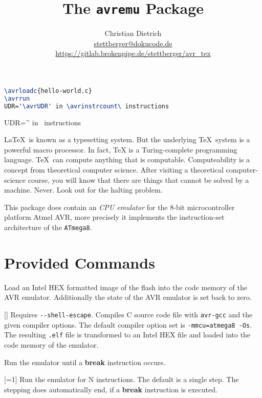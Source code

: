 \documentclass{article}
\title{The \texttt{avremu} Package}
\author{Christian Dietrich\\
\url{stettberger@dokucode.de}\\
\url{https://gitlab.brokenpipe.de/stettberger/avr_tex}}
\begin{document}
\maketitle

\begin{tcolorbox}
  
  \tcblower
  \begin{lstlisting}[language=TeX]
\avrloadc{hello-world.c}
\avrrun
UDR='\avrUDR' in \avrinstrcount\ instructions
\end{lstlisting}
\end{tcolorbox}
\begin{tcolorbox}
\avrrun
UDR='\avrUDR' in \avrinstrcount\ instructions
\end{tcolorbox}


\LaTeX\ is known as a typesetting system. But the underlying \TeX\ system is a powerful macro
processor. In fact, TeX is a Turing-complete programming language. \TeX\ can compute anything that
is computable. Computeability is a concept from theoretical computer science. After visiting a
theoretical computer-science course, you will know that there are things that cannot be solved by a
machine. Never. Look out for the halting problem. 

This package does contain an \emph{CPU emulator} for the 8-bit microcontroller platform Atmel AVR, more
precisely it implements the instruction-set architecture of the \texttt{ATmega8}.

\section{Provided Commands}

Load an Intel HEX formatted image of the flash into the code memory of the AVR
emulator. Additionally the state of the AVR emulator is set back to zero.

\DescribeMacro{\avrloadc}[]{}
Requires \verb|--shell-escape|. Compiles C source code file with \verb|avr-gcc| and the given
compiler options. The default compiler option set is \verb|-mmcu=atmega8 -Os|. The resulting
\texttt{.elf} file is transformed to an Intel HEX file and loaded into the code memory of the
emulator.

\DescribeMacro{\avrrun}
Run the emulator until a \textbf{break} instruction occurs.

\DescribeMacro{\avrstep}[=1]
Run the emulator for N instructions. The default is a single step. The stepping does automatically
end, if a \textbf{break} instruction is executed.
\end{document}
